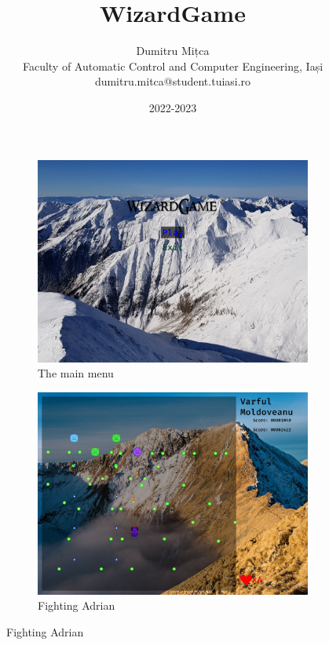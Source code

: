 \documentclass{article}
\title{\textbf{WizardGame}}
\author{
    Dumitru Mițca\\
    Faculty of Automatic Control and Computer Engineering, Iași\\
    dumitru.mitca@student.tuiasi.ro}
\date{2022-2023}
\begin{document}
    \maketitle

    \begin{figure}[h]
        \begin{subfigure}{0.5\linewidth}
            \includegraphics[width=\linewidth]{main-menu}
            \caption{The main menu}
        \end{subfigure}
        \begin{subfigure}{0.5\linewidth}
            \includegraphics[width=\linewidth]{level}
            \caption{Fighting Adrian}
        \end{subfigure}
    \end{figure}
\end{document}
